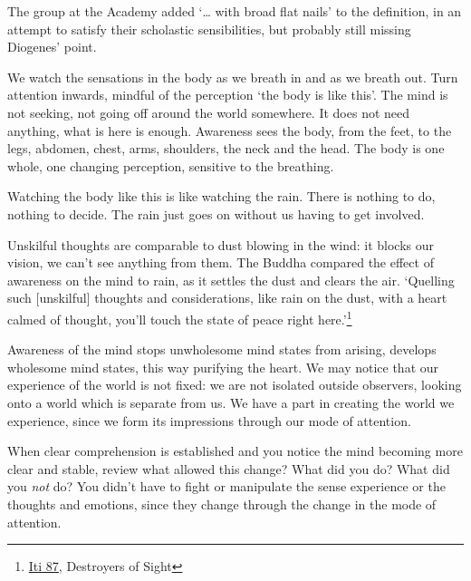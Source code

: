 The group at the Academy added `\ldots{} with broad flat nails' to the
definition, in an attempt to satisfy their scholastic sensibilities, but
probably still missing Diogenes' point.


We watch the sensations in the body as we breath in and as we breath
out. Turn attention inwards, mindful of the perception `the body is like
this'. The mind is not seeking, not going off around the world
somewhere. It does not need anything, what is here is enough. Awareness
sees the body, from the feet, to the legs, abdomen, chest, arms,
shoulders, the neck and the head. The body is one whole, one changing
perception, sensitive to the breathing.

\enlargethispage*{\baselineskip}

Watching the body like this is like watching the rain. There is nothing
to do, nothing to decide. The rain just goes on without us having to get
involved.

\clearpage

\vspace*{-\baselineskip}


Unskilful thoughts are comparable to dust blowing in the wind: it blocks
our vision, we can't see anything from them. The Buddha compared the
effect of awareness on the mind to rain, as it settles the dust and
clears the air. `Quelling such {[}unskilful{]} thoughts and
considerations, like rain on the dust, with a heart calmed of thought,
you'll touch the state of peace right here.'\footnote{\href{https://suttacentral.net/iti87/en/sujato}{Iti
  87}, Destroyers of Sight}

Awareness of the mind stops unwholesome mind states from arising,
develops wholesome mind states, this way purifying the heart. We may
notice that our experience of the world is not fixed: we are not
isolated outside observers, looking onto a world which is separate from
us. We have a part in creating the world we experience, since we form
its impressions through our mode of attention.

When clear comprehension is established and you notice the mind becoming
more clear and stable, review what allowed this change? What did you do?
What did you \emph{not} do? You didn't have to fight or manipulate the
sense experience or the thoughts and emotions, since they change through
the change in the mode of attention.

